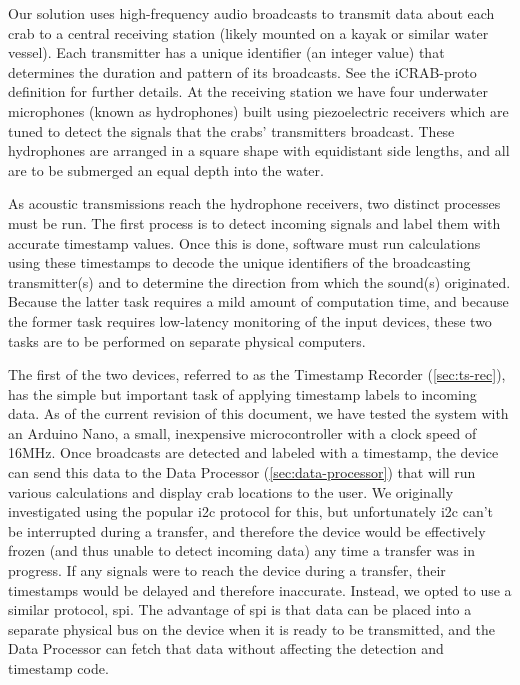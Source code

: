 \documentclass[12pt]{article}
\begin{document}
Our solution uses high-frequency audio broadcasts to transmit data about
each crab to a central receiving station (likely mounted on a kayak or similar
water vessel).
Each transmitter has a unique identifier (an integer value) that determines
the duration and pattern of its broadcasts.
See the \gls{iCRAB-proto} definition for further details.
At the receiving station we have four underwater microphones
(known as hydrophones) built using piezoelectric receivers
which are tuned to detect the signals that the crabs'
transmitters broadcast.
These hydrophones are arranged in a square shape with equidistant side
lengths, and all are to be submerged an equal depth into the water.

As acoustic transmissions reach the hydrophone receivers, two distinct
processes must be run.
The first process is to detect incoming signals and label them with accurate
timestamp values.
Once this is done, software must run calculations using these timestamps
to decode the unique identifiers of the broadcasting transmitter(s) and to
determine the direction from which the sound(s) originated.
Because the latter task requires a mild amount of computation time,
and because the former task requires low-latency monitoring of the input
devices, these two tasks are to be performed on separate physical computers.

The first of the two devices, referred to as the Timestamp Recorder
(\ref{sec:ts-rec}), has the simple but important task of applying
timestamp labels to incoming data.
As of the current revision of this document,
we have tested the system with an Arduino Nano, a small,
inexpensive microcontroller with a clock speed of 16MHz.
Once broadcasts are detected and labeled with a timestamp, the device can
send this data to the Data Processor (\ref{sec:data-processor})
that will run various calculations and display crab locations to the user.
We originally investigated using the popular \gls{i2c} protocol for this, but
unfortunately \gls{i2c} can't be interrupted during a transfer, and therefore
the device would be effectively frozen (and thus unable to detect
incoming data) any time a transfer was in progress.
If any signals were to reach the device during a transfer, their timestamps
would be delayed and therefore inaccurate.
Instead, we opted to use a similar protocol, \gls{spi}.
The advantage of \gls{spi} is that data can be placed into a separate physical
bus on the device when it is ready to be transmitted, and the Data Processor
can fetch that data without affecting the detection and timestamp code.
\end{document}
